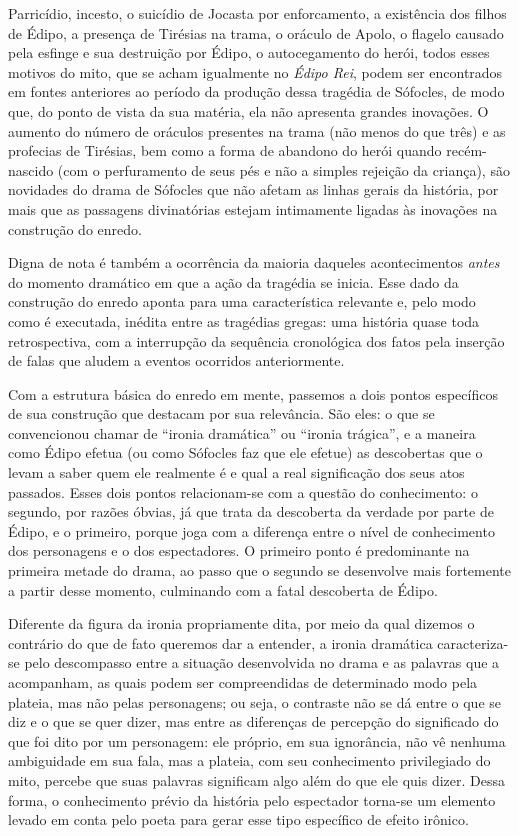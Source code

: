 Parricídio, incesto, o suicídio de Jocasta por enforcamento, a
existência dos filhos de Édipo, a presença de Tirésias na trama, o
oráculo de Apolo, o flagelo causado pela esfinge e sua destruição por
Édipo, o autocegamento do herói, todos esses motivos do mito, que se
acham igualmente no \emph{Édipo Rei}, podem ser encontrados em fontes
anteriores ao período da produção dessa tragédia de Sófocles, de modo
que, do ponto de vista da sua matéria, ela não apresenta grandes
inovações. O aumento do número de oráculos presentes na trama (não menos
do que três) e as profecias de Tirésias, bem como a forma de abandono do
herói quando recém-nascido (com o perfuramento de seus pés e não a
simples rejeição da criança), são novidades do drama de Sófocles que não
afetam as linhas gerais da história, por mais que as passagens
divinatórias estejam intimamente ligadas às inovações na construção do
enredo.

Digna de nota é também a ocorrência da maioria daqueles acontecimentos
\emph{antes} do momento dramático em que a ação da tragédia se inicia.
Esse dado da construção do enredo aponta para uma característica
relevante e, pelo modo como é executada, inédita entre as tragédias
gregas: uma história quase toda retrospectiva, com a interrupção da
sequência cronológica dos fatos pela inserção de falas que aludem a
eventos ocorridos anteriormente.

Com a estrutura básica do enredo em mente, passemos a dois pontos
específicos de sua construção que destacam por sua relevância. São eles: 
o que se convencionou chamar de ``ironia dramática'' ou ``ironia
trágica'', e a maneira como Édipo efetua (ou como Sófocles faz que
ele efetue) as descobertas que o levam a saber quem ele realmente é e
qual a real significação dos seus atos passados. Esses dois pontos
relacionam-se com a questão do conhecimento: o segundo, por razões
óbvias, já que trata da descoberta da verdade por parte de Édipo, e o
primeiro, porque joga com a diferença entre o nível de conhecimento dos
personagens e o dos espectadores. O primeiro ponto é predominante na
primeira metade do drama, ao passo que o segundo se desenvolve mais
fortemente a partir desse momento, culminando com a fatal descoberta de
Édipo.

Diferente da figura da ironia propriamente dita, por meio da qual
dizemos o contrário do que de fato queremos dar a entender, a ironia
dramática caracteriza-se pelo descompasso entre a situação desenvolvida
no drama e as palavras que a acompanham, as quais podem ser
compreendidas de determinado modo pela plateia, mas não pelas
personagens; ou seja, o contraste não se dá entre o que se diz e o que
se quer dizer, mas entre as diferenças de percepção do significado do
que foi dito por um personagem: ele próprio, em sua ignorância, não vê
nenhuma ambiguidade em sua fala, mas a plateia, com seu conhecimento
privilegiado do mito, percebe que suas palavras significam algo além do
que ele quis dizer. Dessa forma, o conhecimento prévio da história pelo
espectador torna-se um elemento levado em conta pelo poeta para gerar
esse tipo específico de efeito irônico.

